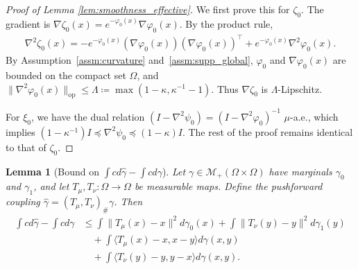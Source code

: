 \documentclass[11pt,reqno]{amsart}
\newtheorem{lemma}[theorem]{Lemma}
\theoremstyle{definition}
\renewcommand{\hat}{\widehat}
\begin{document}
\begin{proof}[Proof of Lemma \ref{lem:smoothness_effective}]
We first prove this for $\zeta_0$. The gradient is $\nabla \zeta_0(x) = e^{-\varphi_0(x)} \nabla \varphi_0(x)$. By the product rule,
\begin{align*}
    \nabla^2 \zeta_0(x) = - e^{-\varphi_0(x)} (\nabla \varphi_0(x))(\nabla \varphi_0(x))^\top + e^{-\varphi_0(x)} \nabla^2 \varphi_0(x).
\end{align*}
By Assumption~\ref{assm:curvature} and~\ref{assm:supp_global}, $\varphi_0$ and $\nabla \varphi_0(x)$ are bounded on the compact set $\Omega$, and $\|\nabla^2 \varphi_0(x)\|_{\mathrm{op}} \le \Lambda \coloneqq \max(1-\kappa, \kappa^{-1}-1)$. Thus $\nabla \zeta_0$ is $\Lambda$-Lipschitz.

For $\xi_0$, we have the dual relation $(I - \nabla^2 \psi_0) = (I - \nabla^2 \varphi_0)^{-1}$ $\mu$-a.e., which implies $(1-\kappa^{-1})I \preceq \nabla^2 \psi_0 \preceq (1-\kappa)I$. The rest of the proof remains identical to that of $\zeta_0$.
\end{proof}


\begin{lemma}[Bound on $\int c d\hat\gamma-\int c d\gamma$]
\label{lem:uot_cost_expansion}
Let $\gamma \in \mathcal{M}_+(\Omega \times \Omega)$ have marginals $\gamma_0$ and $\gamma_1$, and let $T_\mu, T_\nu: \Omega \to \Omega$ be measurable maps.
Define the pushforward coupling $\hat\gamma = (T_\mu, T_\nu)_\# \gamma$. Then
\begin{equation}
\label{eq:cost_diff_exact}
\begin{aligned}
\int c d\hat\gamma - \int c d\gamma 
&\le \int \|T_\mu(x)-x\|^2 d\gamma_0(x) + \int \|T_\nu(y)-y\|^2 d\gamma_1(y) \\
&\quad + \int \langle T_\mu(x)-x, x-y \rangle d\gamma(x,y) \\
&\quad + \int \langle T_\nu(y)-y, y-x \rangle d\gamma(x,y).
\end{aligned}
\end{equation}
\end{lemma}
\end{document}
